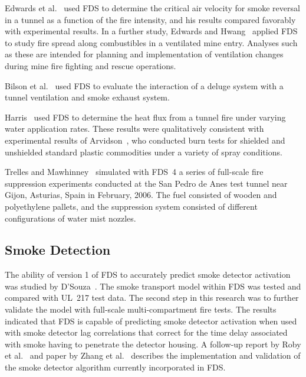 Edwards et al.~\cite{Edwards:SME2005,Edwards:FSJ} used FDS to determine the critical air velocity for smoke reversal in a tunnel as a function of the fire intensity, and his results compared favorably with  experimental results.  In a  further study,  Edwards and Hwang~\cite{Edwards:SME2006} applied FDS to study fire spread along combustibles in a ventilated mine entry. Analyses such as these are intended for planning and implementation of ventilation changes during mine fire fighting and rescue operations.

Bilson et al.~\cite{Bilson:2008} used FDS to evaluate the interaction of a deluge system with a tunnel ventilation and smoke exhaust system.

Harris~\cite{Harris:ISTSS2010} used FDS to determine the heat flux from a tunnel fire under varying water application rates. These results were qualitatively consistent with experimental results of Arvidson~\cite{Arvidson:ISTSS2010}, who conducted burn tests for shielded and unshielded standard plastic commodities under a variety of spray conditions.

Trelles and Mawhinney~\cite{Trelles:JFPE2010,Mawhinney:FT2012} simulated with FDS~4 a series of full-scale fire suppression experiments conducted at the San Pedro de Anes test tunnel near Gijon, Asturias, Spain in February, 2006. The fuel consisted of wooden and polyethylene pallets, and the suppression system consisted of different configurations of water mist nozzles.




\subsection{Smoke Detection}

The ability of version 1 of FDS to accurately predict smoke detector activation was studied by D'Souza~\cite{DSouza:1}. The smoke transport model within FDS was tested and compared with UL~217 test data. The second step in this research was to further validate the model with full-scale multi-compartment fire tests. The results indicated that FDS is capable of predicting smoke detector activation when used with smoke detector lag correlations that correct for the time delay associated with smoke having to penetrate the detector housing. A follow-up report by Roby et al.~\cite{CSE_GCR} and paper by Zhang et al.~\cite{Zhang:FSJ2008} describes the implementation and validation of the smoke detector algorithm currently incorporated in FDS.

